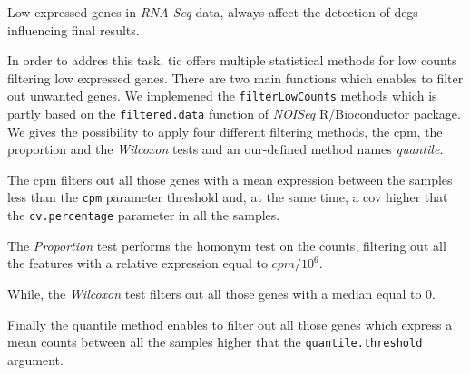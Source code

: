 Low expressed genes in \textit{RNA-Seq} data, always affect the detection of \glspl{deg} \cite{Sha2015} influencing final results.

In order to addres this task, \gls{tic} offers multiple statistical methods for low counts filtering low expressed genes.
There are two main functions which enables to filter out unwanted genes. 
We implemened the \lstinline!filterLowCounts! methods which is partly based on the \lstinline!filtered.data! function of \textit{NOISeq} R/Bioconductor package. 
We gives the possibility to apply four different filtering methods, the \gls{cpm}, the {proportion} and the \textit{Wilcoxon} tests and an our-defined method names \textit{quantile}.

The \gls{cpm} filters out all those genes with a mean expression between the samples less than the \lstinline!cpm! parameter threshold and, at the same time, a \gls{cov} higher that the \lstinline!cv.percentage! parameter in all the samples.

The \textit{Proportion} test performs the homonym test on the counts, filtering out all the features with a relative expression equal to $cpm/10^6$.

While, the \textit{Wilcoxon} test filters out all those genes with a median equal to $0$.

Finally the quantile method enables to filter out all those genes which express a mean counts between all the samples higher that the \lstinline!quantile.threshold! argument.